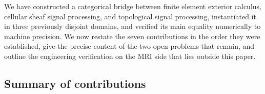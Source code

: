 
\noindent
We have constructed a categorical bridge between finite element
exterior calculus, cellular sheaf signal processing, and topological
signal processing, instantiated it in three previously disjoint
domains, and verified its main equality numerically to machine
precision. We now restate the seven contributions in the order they
were established, give the precise content of the two open problems
that remain, and outline the engineering verification on the MRI
side that lies outside this paper.

\subsection{Summary of contributions}\label{subsec:disc-contrib}

